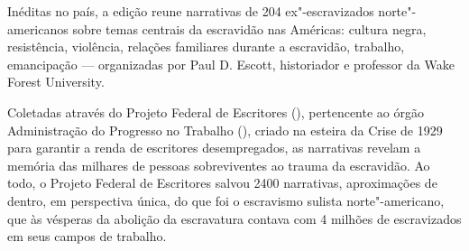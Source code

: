 \hspace*{-7cm}\hrulefill\hspace*{-7cm}

\medskip

\noindent{}Inéditas no país, a edição reune narrativas de 204 ex"-escravizados norte"-americanos sobre temas centrais da escravidão nas Américas: cultura negra, resistência, violência, relações familiares durante a escravidão, trabalho, emancipação --- organizadas por Paul D. Escott, historiador e professor da Wake Forest University.

Coletadas através do Projeto Federal de Escritores (), pertencente ao órgão Administração do Progresso no Trabalho (), criado na esteira da Crise de 1929 para garantir a renda de escritores desempregados, as narrativas revelam a memória das milhares de pessoas sobreviventes ao trauma da escravidão. Ao todo, o Projeto Federal de Escritores salvou 2400 narrativas, aproximações de dentro, em perspectiva única, do que foi o escravismo sulista norte"-americano, que às vésperas da abolição da escravatura contava com 4 milhões de escravizados em seus campos de trabalho.

\vfill

\hspace*{-.4cm}\begin{minipage}[c]{.5\linewidth}
\small{
{}}
\end{minipage}

\pagebreak

\hspace{.5cm}

